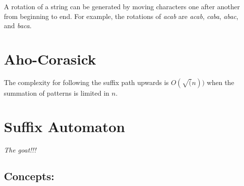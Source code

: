     A rotation of a string can be generated by moving characters one after another from beginning to end.
    For example, the rotations of \textit{acab} are \textit{acab}, \textit{caba}, \textit{abac}, and \textit{baca}.


\section{Aho-Corasick}

    The complexity for following the suffix path upwards is $O(\sqrt(n))$ when the summation of patterns is limited in $n$.



\vspace{5pts}

\section{Suffix Automaton}

    \textit{The goat!!!} 

    \subsection{Concepts:}

